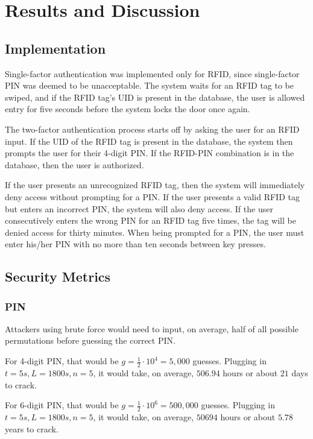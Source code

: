 \section{Results and Discussion}

\subsection{Implementation}
Single-factor authentication was implemented only for RFID, since single-factor PIN was deemed to be unacceptable. The system waits for an RFID tag to be swiped, and if the RFID tag's UID is present in the database, the user is allowed entry for five seconds before the system locks the door once again.

The two-factor authentication process starts off by asking the user for an RFID input. If the UID of the RFID tag is present in the database, the system then prompts the user for their 4-digit PIN. If the RFID-PIN combination is in the database, then the user is authorized.

If the user presents an unrecognized RFID tag, then the system will immediately deny access without prompting for a PIN. If the user presents a valid RFID tag but enters an incorrect PIN, the system will also deny access. If the user consecutively enters the wrong PIN for an RFID tag five times, the tag will be denied access for thirty minutes. When being prompted for a PIN, the user must enter his/her PIN with no more than ten seconds between key presses.

\subsection{Security Metrics}

\subsubsection{PIN}
Attackers using brute force would need to input, on average, half of all possible permutations before guessing the correct PIN.

For 4-digit PIN, that would be $ g = \frac12 \cdot 10^4 = 5,000 $ guesses. Plugging in $t=5s, L=1800s, n=5$, it would take, on average, $506.94$ hours or about $21$ days to crack.

For 6-digit PIN, that would be $ g = \frac12 \cdot 10^6 = 500,000 $ guesses. Plugging in $t=5s, L=1800s, n=5$, it would take, on average, $50694$ hours or about $5.78$ years to crack.

